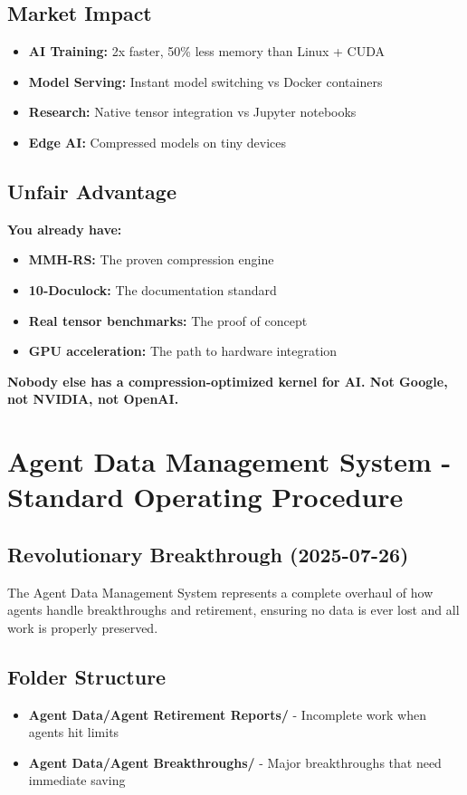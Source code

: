 \documentclass[12pt,a4paper]{article}
\begin{document}
\subsection{Market Impact}
\begin{itemize}
    \item \textbf{AI Training:} 2x faster, 50\% less memory than Linux + CUDA
    \item \textbf{Model Serving:} Instant model switching vs Docker containers
    \item \textbf{Research:} Native tensor integration vs Jupyter notebooks
    \item \textbf{Edge AI:} Compressed models on tiny devices
\end{itemize}

\subsection{Unfair Advantage}
\textbf{You already have:}
\begin{itemize}
    \item \textbf{MMH-RS:} The proven compression engine
    \item \textbf{10-Doculock:} The documentation standard
    \item \textbf{Real tensor benchmarks:} The proof of concept
    \item \textbf{GPU acceleration:} The path to hardware integration
\end{itemize}

\textbf{Nobody else has a compression-optimized kernel for AI. Not Google, not NVIDIA, not OpenAI.}

\section{Agent Data Management System - Standard Operating Procedure}

\subsection{Revolutionary Breakthrough (2025-07-26)}
The Agent Data Management System represents a complete overhaul of how agents handle breakthroughs and retirement, ensuring no data is ever lost and all work is properly preserved.

\subsection{Folder Structure}
\begin{itemize}
    \item \textbf{Agent Data/Agent Retirement Reports/} - Incomplete work when agents hit limits
    \item \textbf{Agent Data/Agent Breakthroughs/} - Major breakthroughs that need immediate saving
\end{itemize}
\end{document}
